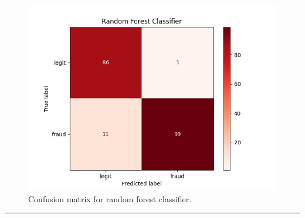 \documentclass{article}
\begin{document}
\begin{center}
  \begin{figure}[H]
    \includegraphics{rf_classifier.png}
    \caption{Confusion matrix for random forest classifier.}
  \end{figure}
\end{center}

\noindent\rule{\textwidth}{0.4pt}\\

\end{document}
